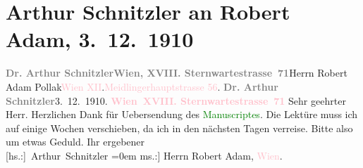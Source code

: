 

               \section[Arthur Schnitzler an Robert Adam, 3. 12. 1910]{ Arthur Schnitzler an Robert Adam, 3. 12. 1910}\nopagebreak{}\rehead{ }\normalsize\beginnumbering{} \toendnotes[C]{\smallbreak\pagebreak[2]} 
\toendnotes[C]{\smallbreak}\pstart{}{\pb}\textcolor{gray}{\textbf{Dr. Arthur Schnitzler}}\pend{}\pstart{}\textcolor{pink}{\textcolor{gray}{\textbf{Wien, XVIII. Sternwartestrasse 71}}}{}\ledrightnote{\textcolor{pink}{Sternwartestraße}}\pend{}{\bigskip}\pstart{}{\pb}Herrn Robert Adam
                        Pollak\pend{}\pstart{}\textcolor{pink}{Wien XII}{}\ledrightnote{\textcolor{pink}{XII., Meidling}}.\pend{}\pstart{}\textcolor{pink}{Meidlingerhauptstrasse 56}{}\ledrightnote{\textcolor{pink}{Meidlinger Hauptstraße}}.\pend{}{\bigskip}\pstart
           {\pb}\textcolor{gray}{\textbf{Dr. Arthur Schnitzler}}\hfill 3. 12. 1910.\pend
           \pstart
           \textcolor{gray}{\textbf{\textcolor{pink}{Wien XVIII. Sternwartestrasse 71}{}\ledrightnote{\textcolor{pink}{Sternwartestraße}}}}\pend
           \pstart\center{}Sehr geehrter Herr.\pend\pstart
           Herzlichen Dank für Uebersendung des \textcolor{green}{Manuscriptes}{}. Die Lektüre muss ich auf einige Wochen
                    verschieben, da ich in den nächsten Tagen verreise. Bitte also um etwas
                    Geduld.\pend
           \pstart
           Ihr ergebener{\\[\baselineskip]}\spacefill\mbox{{[}hs.:{]} Arthur Schnitzler}\pend
           \leftskip=0em{}\pstart
           \noindent{}{[}ms.:{]} Herrn Robert Adam, \textcolor{pink}{Wien}{}\ledrightnote{\textcolor{pink}{Wien}}.\pend
           \endnumbering{}  
      